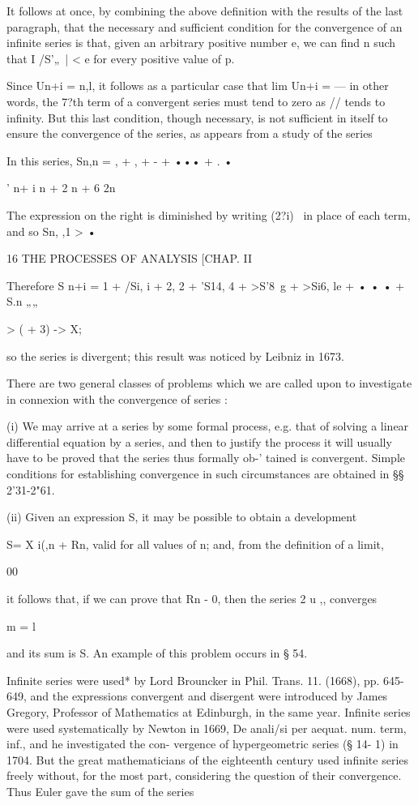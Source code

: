 It follows at once, by combining the above definition with the results
of the last paragraph, that the necessary and sufficient condition for
the convergence of an infinite series is that, given an arbitrary
positive number e, we can find n such that I /S'„\ | < e for every
positive value of p.

Since Un+i = n,l, it follows as a particular case that lim Un+i = — in
other words, the 7?th term of a convergent series must tend to zero as
// tends to infinity. But this last condition, though necessary, is
not sufficient in itself to ensure the convergence of the series, as
appears from a study of the series

In this series, Sn,n = , + , + - + ••• + . •

' n+ i n + 2 n + 6 2n

The expression on the right is diminished by writing (2?i)~ in place
of each term, and so Sn, ,1 > •



16 THE PROCESSES OF ANALYSIS [CHAP. II

Therefore S n+i = 1 + /Si, i + 2, 2 + 'S14, 4 + >S'8\ g + >Si6, le + •
• • + S.n „„

> ( + 3) -> X;

so the series is divergent; this result was noticed by Leibniz in
1673.

There are two general classes of problems which we are called upon to
investigate in connexion with the convergence of series :

(i) We may arrive at a series by some formal process, e.g. that of
solving a linear differential equation by a series, and then to
justify the process it will usually have to be proved that the series
thus formally ob-' tained is convergent. Simple conditions for
establishing convergence in such circumstances are obtained in §§
2'31-2"61.

(ii) Given an expression S, it may be possible to obtain a development

S= X i(,n + Rn, valid for all values of n; and, from the definition
of a limit,

00

it follows that, if we can prove that Rn - 0, then the series 2 u ,,
converges

m = l

and its sum is S. An example of this problem occurs in § 54.

Infinite series were used* by Lord Brouncker in Phil. Trans. 11.
(1668), pp. 645-649, and the expressions convergent and disergent were
introduced by James Gregory, Professor of Mathematics at Edinburgh, in
the same year. Infinite series were used systematically by Newton in
1669, De anali/si per aequat. num. term, inf., and he investigated the
con- vergence of hypergeometric series (§ 14- 1) in 1704. But the
great mathematicians of the eighteenth century used infinite series
freely without, for the most part, considering the question of their
convergence. Thus Euler gave the sum of the series

